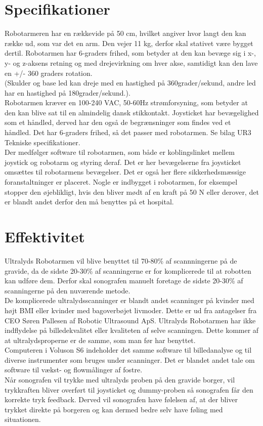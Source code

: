\section{Specifikationer}
Robotarmeren har en rækkevide på 50 cm, hvilket angiver hvor langt den kan række ud, som var det en arm. Den vejer 11 kg, derfor skal stativet være bygget dertil. Robotarmen har 6-graders frihed, som betyder at den kan bevæge sig i x-, y- og z-aksens retning og med drejevirkning om hver akse, samtidigt kan den lave en +/- 360 graders rotation. \\
(Skulder og base led kan dreje med en hastighed på 360grader/sekund,  andre led har en hastighed på 180grader/sekund.). \\
Robotarmen kræver en 100-240 VAC, 50-60Hz strømforsyning, som betyder at den kan blive sat til en almindelig dansk stikkontakt. 
\newline 
Joysticket har bevægelighed som et håndled, derved har den også de begrænsninger som findes ved et håndled. Det har 6-graders frihed, så det passer med robotarmen. Se bilag UR3 Tekniske specifikationer. \\

Der medfølger software til robotarmen, som både er koblingslinket mellem joystick og robotarm og styring deraf. Det er her bevægelserne fra joysticket omsættes til robotarmens bevægelser. Det er også her flere sikkerhedsmæssige foranstaltninger er placeret. Nogle er indbygget i robotarmen, for eksempel stopper den øjeblikligt, hvis den bliver mødt af en kraft på 50 N eller derover, det er blandt andet derfor den må benyttes på et hospital.    

\section{Effektivitet}
Ultralyds Robotarmen vil blive benyttet til 70-80\% af scannningerne på de gravide, da de sidste 20-30\% af scanningerne er for komplicerede til at robotten kan udføre dem. Derfor skal sonografen manuelt foretage de sidste 20-30\% af scanningerne på den nuværende metode. \\ 
De komplicerede ultralydsscanninger er blandt andet scanninger på kvinder med højt BMI eller kvinder med bagoverbøjet livmoder. Dette er ud fra antagelser fra CEO Søren Pallesen af Robotic Ultrasound ApS. 
\newline 
Ultralyds Robotarmen har ikke indflydelse på billedekvalitet eller kvaliteten af selve scanningen. Dette kommer af at ultralydsproperne er de samme, som man før har benyttet. \\Computeren i Voluson S6 indeholder det samme software til billedanalyse og til diverse instrumenter som bruges under scanninger. Det er blandet andet tale om software til vækst- og flowmålinger af fostre.   \\
Når sonografen vil trykke med ultralyds proben på den gravide borger, vil trykkraften bliver overført til joysticket og dummy-proben så sonografen får den korrekte tryk feedback. Derved vil sonografen have følelsen af, at der bliver trykket direkte på borgeren og kan dermed bedre selv have føling med situationen. 
